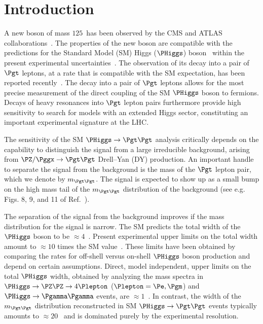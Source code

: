 \section{Introduction}
\label{sec:introduction}

A new boson of mass $125$~\GeV has been observed by the CMS and ATLAS collaborations~\cite{Higgs-Discovery_CMS,Higgs-Discovery_ATLAS}.
The properties of the new boson are compatible with the predictions for the Standard Model (SM) 
Higgs ($\PHiggs$) boson~\cite{Englert:1964et,Higgs:1964ia,Higgs:1964pj,Guralnik:1964eu,Higgs:1966ev,Kibble:1967sv}
within the present experimental uncertainties~\cite{HIG-14-014,Chatrchyan:2014tja,Khachatryan:2014iha,HIG-14-009}.
The observation of its decay into a pair of $\Pgt$ leptons, at a rate that is compatible with the SM expectation, has been reported recently~\cite{HIG-15-002}.
The decay into a pair of $\Pgt$ leptons allows for the most precise measurement of the direct coupling of the SM $\PHiggs$ boson to fermions.
Decays of heavy resonances into $\Pgt$ lepton pairs furthermore provide high sensitivity to search for models with an extended Higgs sector,
constituting an important experimental signature at the LHC.

The sensitivity of the SM $\PHiggs \to \Pgt\Pgt$ analysis critically depends on
the capability to distinguish the signal from a large irreducible background, arising from $\PZ/\Pggx \to \Pgt\Pgt$ Drell--Yan (DY) production.
An important handle to separate the signal from the background is the mass of the $\Pgt$ lepton pair, which we denote by $m_{\Pgt\Pgt}$.
The signal is expected to show up as a small bump on the high mass tail of the $m_{\Pgt\Pgt}$ distribution of the background
(see e.g. Figs. 8, 9, and 11 of Ref.~\cite{HIG-13-004}).

The separation of the signal from the background improves if the mass distribution for the signal is narrow.
The SM predicts the total width of the $\PHiggs$ boson to be $\approx 4$~\MeV.
Present experimental upper limits on the total width amount to $\approx 10$ times the SM value~\cite{HIG-14-002,Aad:2015xua}.
These limits have been obtained by comparing the rates for off-shell versus on-shell $\PHiggs$ boson production and depend on certain assumptions.
Direct, model independent, upper limits on the total $\PHiggs$ width, 
obtained by analyzing the mass spectra in $\PHiggs \to \PZ\PZ \to 4 \Plepton$ ($\Plepton = \Pe, \Pgm$) and $\PHiggs \to \Pgamma\Pgamma$ events, are $\approx 1$~\GeV.
In contrast, the width of the $m_{\Pgt\Pgt}$ distribution reconstructed in SM $\PHiggs \to \Pgt\Pgt$ events typically amounts to $\approx 20$~\GeV 
and is dominated purely by the experimental resolution.

